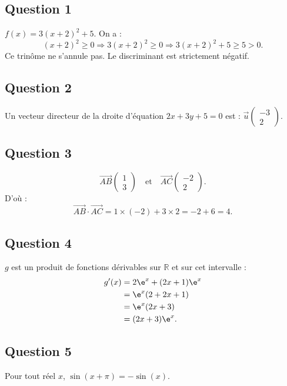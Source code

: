\subsection*{Question 1}

\(f(x) = 3(x + 2)^2 + 5\). On a :
\[
(x+2)^2 \geqslant 0 \Rightarrow 3(x+2)^2 \geqslant 0 \Rightarrow 3(x+2)^2 + 5 \geqslant 5 > 0.
\]
Ce trinôme ne s'annule pas. Le discriminant est strictement négatif.

\subsection*{Question 2}

Un vecteur directeur de la droite d'équation \(2x + 3y + 5 = 0\) est : \(\vec{u} \begin{pmatrix} -3 \\ 2 \end{pmatrix}\).

\subsection*{Question 3}

\[
\overrightarrow{AB} \begin{pmatrix} 1 \\ 3 \end{pmatrix} \quad \text{et} \quad \overrightarrow{AC} \begin{pmatrix} -2 \\ 2 \end{pmatrix}.
\]
D'où :
\[
\overrightarrow{AB} \cdot \overrightarrow{AC} = 1 \times (-2) + 3 \times 2 = -2 + 6 = 4.
\]

\subsection*{Question 4}

\(g\) est un produit de fonctions dérivables sur \(\mathbb{R}\) et sur cet intervalle :
\begin{align*}
g'(x) &= 2\e^x + (2x + 1)\e^x \\
&= \e^x(2 + 2x + 1) \\
&= \e^x(2x + 3) \\
&= (2x + 3)\e^x.
\end{align*}

\subsection*{Question 5}

Pour tout réel \(x\), \(\sin(x + \pi) = -\sin(x)\).
